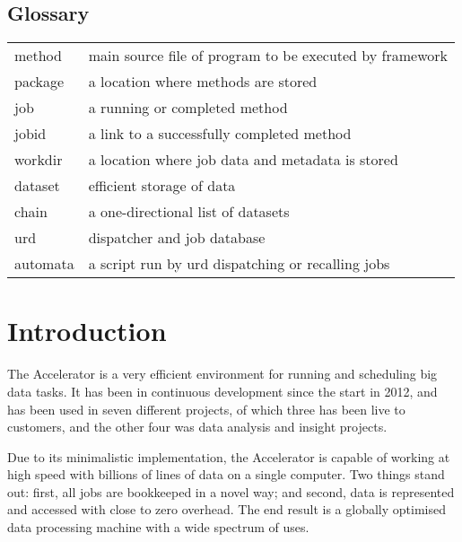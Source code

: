 \documentclass[a4paper]{report}
\begin{document}
\titleLL
\newpage




\section*{Glossary}

\begin{tabular*}{\textwidth}{ll}
method    & main source file of program to be executed by framework\\
package   & a location where methods are stored\\
job       & a running or completed method\\
jobid     & a link to a successfully completed method\\
workdir   & a location where job data and metadata is stored\\
dataset   & efficient storage of data\\
chain     & a one-directional list of datasets\\
urd       & dispatcher and job database\\
automata  & a script run by urd dispatching or recalling jobs\\
\end{tabular*}


\chapter{Introduction}

The Accelerator is a very efficient environment for running and
scheduling big data tasks.  It has been in continuous development
since the start in 2012, and has been used in seven different
projects, of which three has been live to customers, and the other
four was data analysis and insight projects.

Due to its minimalistic implementation, the Accelerator is capable of
working at high speed with billions of lines of data on a single
computer.  Two things stand out: first, all jobs are bookkeeped in a
novel way; and second, data is represented and accessed with close to
zero overhead.  The end result is a globally optimised data processing
machine with a wide spectrum of uses.
\end{document}
